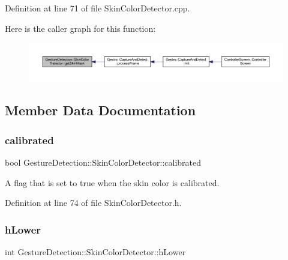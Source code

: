 Definition at line 71 of file Skin\+Color\+Detector.\+cpp.

Here is the caller graph for this function\+:
\nopagebreak
\begin{figure}[H]
\begin{center}
\leavevmode
\includegraphics[width=350pt]{class_gesture_detection_1_1_skin_color_detector_a8cf2f51c4c7797a126b767e48458a006_icgraph}
\end{center}
\end{figure}


\subsection{Member Data Documentation}
\mbox{\label{class_gesture_detection_1_1_skin_color_detector_aef5ea498d5f27603fa5c2f17a5ebeb25}} 
\subsubsection{\texorpdfstring{calibrated}{calibrated}}
{\footnotesize\ttfamily bool Gesture\+Detection\+::\+Skin\+Color\+Detector\+::calibrated\hspace{0.3cm}{\ttfamily [private]}}



A flag that is set to true when the skin color is calibrated. 



Definition at line 74 of file Skin\+Color\+Detector.\+h.

\mbox{\label{class_gesture_detection_1_1_skin_color_detector_ae08f063d47dea63ee539dd41cee45097}} 
\subsubsection{\texorpdfstring{h\+Lower}{hLower}}
{\footnotesize\ttfamily int Gesture\+Detection\+::\+Skin\+Color\+Detector\+::h\+Lower\hspace{0.3cm}{\ttfamily [private]}}



